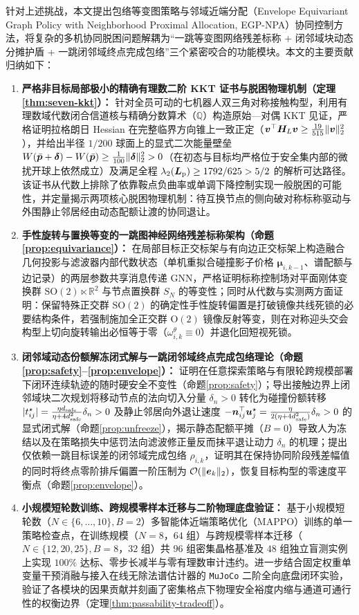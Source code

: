针对上述挑战，本文提出包络等变图策略与邻域近端分配（Envelope Equivariant Graph Policy with Neighborhood Proximal Allocation, EGP-NPA）协同控制方法，将复杂的多机协同脱困问题解耦为“一跳等变图网络残差标称 + 闭邻域块动态分摊护盾 + 一跳闭邻域终点完成包络”三个紧密咬合的功能模块。本文的主要贡献归纳如下：
\begin{enumerate}
 \item \textbf{严格非目标局部极小的精确有理数二阶 KKT 证书与脱困物理机制（定理\ref{thm:seven-kkt}）：} 针对全员可动的七机器人双三角对称接触构型，利用有理数域代数闭合信道核与精确分数算术（$\mathbb Q$）构造原始—对偶 KKT 见证，严格证明拉格朗日 Hessian 在完整临界方向锥上一致正定（$\boldsymbol v^{\top}\boldsymbol H_L\boldsymbol v\ge\frac{19}{515}\lVert\boldsymbol v\rVert_2^2$），并给出半径 $1/200$ 球面上的显式二次能量壁垒 $W(\bar{\boldsymbol{p}}+\boldsymbol\delta)-W(\bar{\boldsymbol{p}})\ge\frac1{100}\lVert\boldsymbol\delta\rVert_2^2>0$（在初态与目标均严格位于安全集内部的微扰开球上依然成立）及满足全程 $\lambda_2(\boldsymbol{L}_{\mathrm{p}})\ge 1792/625>5/2$ 的解析可达路径。该证书从代数上排除了依靠鞍点负曲率或单调下降控制实现一般脱困的可能性，并定量揭示两项核心脱困物理机制：待互换节点的侧向破对称标称驱动与外围静止邻居经由动态配额让渡的协同退让。
 \item \textbf{手性旋转与置换等变的一跳图神经网络残差标称架构（命题\ref{prop:equivariance}）：} 在局部目标正交标架与有向边正交标架上构造融合几何投影与滤波器内部代数状态（单机重拟合碰撞影子价格 $\boldsymbol\mu_{i,k-1}$、谱配额与边记录）的两层参数共享消息传递 GNN，严格证明标称控制场对平面刚体变换群 $\mathrm{SO}(2)\ltimes\mathbb R^2$ 与节点置换群 $S_N$ 的等变性；同时从代数与实测两方面证明：保留特殊正交群 $\mathrm{SO}(2)$ 的确定性手性旋转偏置是打破镜像共线死锁的必要结构条件，若强制施加全正交群 $\mathrm{O}(2)$ 镜像反射等变，则在对称迎头交会构型上切向旋转输出必恒等于零（$\omega_{i,k}^\theta\equiv 0$）并退化回短视死锁。
 \item \textbf{闭邻域动态份额解冻闭式解与一跳闭邻域终点完成包络理论（命题\ref{prop:safety}--\ref{prop:envelope}）：} 证明在任意探索策略与有限轮跨规模部署下闭环连续轨迹的随时硬安全不变性（命题\ref{prop:safety}）；导出接触边界上闭邻域块二次规划将移动节点的法向切入分量 $\delta_n>0$ 转化为碰撞份额转移 $|t_{ij}^\star|=\frac{\eta d_{\mathrm{safe}}}{\eta+4d_{\mathrm{safe}}^2}\delta_n>0$ 及静止邻居向外退让速度 $-\boldsymbol n_{ij}^{\top}\boldsymbol{u}_j^\star=\frac{\eta}{2(\eta+4d_{\mathrm{safe}}^2)}\delta_n>0$ 的显式闭式解（命题\ref{prop:unfreeze}），揭示静态配额平摊（$B=0$）导致人为冻结以及在策略损失中惩罚法向滤波修正量反而抹平退让动力 $\delta_n$ 的机理；提出仅依赖一跳目标误差的闭邻域完成包络 $\rho_{i,k}$，证明其在保持协同阶段残差幅值的同时将终点零阶排斥偏置一阶压制为 $\mathcal O(\lVert\boldsymbol{e}_k\rVert_2)$，恢复目标构型的零速度平衡点（命题\ref{prop:envelope}）。
 \item \textbf{小规模短轮数训练、跨规模零样本迁移与二阶物理底盘验证：} 基于小规模短轮数（$N\in\{6,\dots,10\},B=2$）多智能体近端策略优化（MAPPO）训练的单一策略检查点，在训练规模（$N=8$，$64$ 组）与跨规模零样本迁移（$N\in\{12,20,25\},B=8$，$32$ 组）共 $96$ 组密集晶格基准及 $48$ 组独立盲测实例上实现 $100\%$ 达标、零步长减半与零有理数审计违约。进一步结合固定权重单变量干预消融与接入在线无除法谱估计器的 \texttt{MuJoCo} 二阶全向底盘闭环实验，验证了各模块的因果贡献并刻画了密集格点下物理安全裕度内缩与通道可通行性的权衡边界（定理\ref{thm:passability-tradeoff}）。
\end{enumerate}

